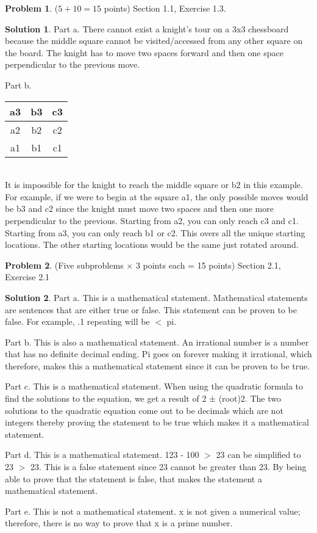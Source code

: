 \documentclass{article}
\theoremstyle{definition}
\newtheorem{problem}{Problem}
\newtheorem*{solution}{Solution}
\begin{document}
\begin{problem} ($5+10=15$ points) Section 1.1, Exercise 1.3.
\end{problem}
\begin{solution}
Part a. There cannot exist a knight's tour on a 3x3 chessboard because the middle square cannot be visited/accessed from any other square on the board. The knight has to move two spaces forward and then one space perpendicular to the previous move.

Part b.
\begin{tabular}{ | c | c | c | } 
  \hline
  a3 & b3 & c3 \\ 
  \hline
  a2 & b2 & c2 \\ 
  \hline
  a1 & b1 & c1 \\ 
  \hline
\end{tabular}
\\
It is impossible for the knight to reach the middle square or b2 in this example. For example, if we were to begin at the square a1, the only possible moves would be b3 and c2 since the knight must move two spaces and then one more perpendicular to the previous. Starting from a2, you can only reach c3 and c1. Starting from a3, you can only reach b1 or c2. This overs all the unique starting locations. The other starting locations would be the same just rotated around.

\end{solution}

\begin{problem} (Five subproblems $\times$ 3 points each = 15 points) Section 2.1, Exercise 2.1
\end{problem}
\begin{solution}
Part a. This is a mathematical statement. Mathematical statements are sentences that are either true or false. This statement can be proven to be false. For example, .1 repeating will be $<$ pi.

Part b. This is also a mathematical statement. An irrational number is a number that has no definite decimal ending. Pi goes on forever making it irrational, which therefore, makes this a mathematical statement since it can be proven to be true.

Part c. This is a mathematical statement. When using the quadratic formula to find the solutions to the equation, we get a result of 2 ± (root)2. The two solutions to the quadratic equation come out to be decimals which are not integers thereby proving the statement to be true which makes it a mathematical statement.

Part d. This is a mathematical statement. 123 - 100 $>$ 23 can be simplified to 23 $>$ 23. This is a false statement since 23 cannot be greater than 23. By being able to prove that the statement is false, that makes the statement a mathematical statement.

Part e. This is not a mathematical statement. x is not given a numerical value; therefore, there is no way to prove that x is a prime number.
\end{solution}
\end{document}
